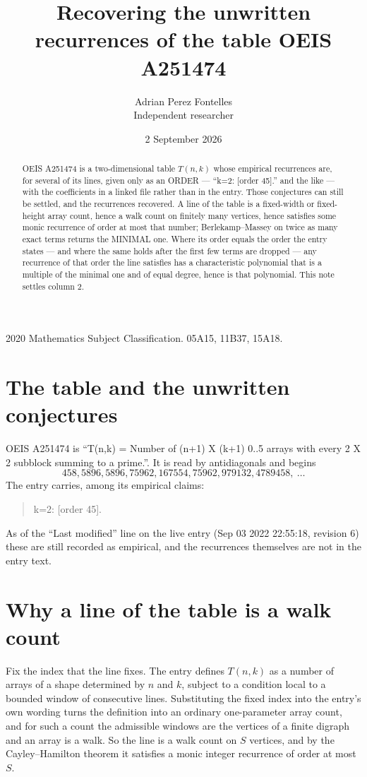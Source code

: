 \documentclass[11pt,a4paper]{article}
\title{Recovering the unwritten recurrences of the table OEIS A251474}
\author{Adrian Perez Fontelles\\ \small Independent researcher}
\date{2 September 2026}
\theoremstyle{plain}
\theoremstyle{definition}
\begin{document}
\maketitle

\begin{abstract}
OEIS A251474 is a two-dimensional table $T(n,k)$ whose empirical recurrences are, for several of
its lines, given only as an ORDER --- ``k=2: [order 45].'' and the like --- with the
coefficients in a linked file rather than in the entry. Those conjectures can still be settled,
and the recurrences recovered. A line of the table is a fixed-width or fixed-height array
count, hence a walk count on finitely many vertices, hence satisfies some monic recurrence of
order at most that number; Berlekamp--Massey on twice as many exact terms returns the MINIMAL
one. Where its order equals the order the entry states --- and where the same holds after the
first few terms are dropped --- any recurrence of that order the line satisfies has a
characteristic polynomial that is a multiple of the minimal one and of equal degree, hence is
that polynomial. This note settles column 2.
\end{abstract}

\noindent\small 2020 Mathematics Subject Classification. 05A15, 11B37, 15A18.\normalsize

\section{The table and the unwritten conjectures}

OEIS A251474 is ``T(n,k) = Number of (n+1) X (k+1) 0..5 arrays with every 2 X 2 subblock summing to a prime.''. It is read by antidiagonals and begins
\[
458, 5896, 5896, 75962, 167554, 75962, 979132, 4789458,\ \dots
\]
The entry carries, among its empirical claims:
\begin{quote}\small
k=2: [order 45].
\end{quote}
As of the ``Last modified'' line on the live entry (Sep 03 2022 22:55:18, revision 6) these are still
recorded as empirical, and the recurrences themselves are not in the entry text.

\section{Why a line of the table is a walk count}

Fix the index that the line fixes. The entry defines $T(n,k)$ as a number of arrays of a shape
determined by $n$ and $k$, subject to a condition local to a bounded window of consecutive
lines. Substituting the fixed index into the entry's own wording turns the definition into an
ordinary one-parameter array count, and for such a count the admissible windows are the
vertices of a finite digraph and an array is a walk. So the line is a walk count on $S$
vertices, and by the Cayley--Hamilton theorem it satisfies a monic integer recurrence of order
at most $S$.
\end{document}
